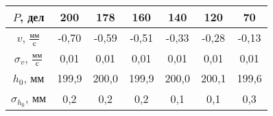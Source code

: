 \begin{tabular}[t]{|c|c|c|c|c|c|c|}
\hline
$P$, дел & 200 & 178 & 160 & 140 & 120 & 70 \\ 
\hline
$v$, $\frac{мм}{с}$ & -0,70 & -0,59 & -0,51 & -0,33 & -0,28 & -0,13 \\ 
\hline
$\sigma_v$, $\frac{мм}{с}$ & 0,01 & 0,01 & 0,01 & 0,01 & 0,01 & 0,01 \\ 
\hline
$h_0$, мм & 199,9 & 200,0 & 199,9 & 200,0 & 200,1 & 199,6 \\ 
\hline
$\sigma_{h_0}$, мм & 0,2 & 0,2 & 0,2 & 0,1 & 0,1 & 0,3 \\ 
\hline
\end{tabular}